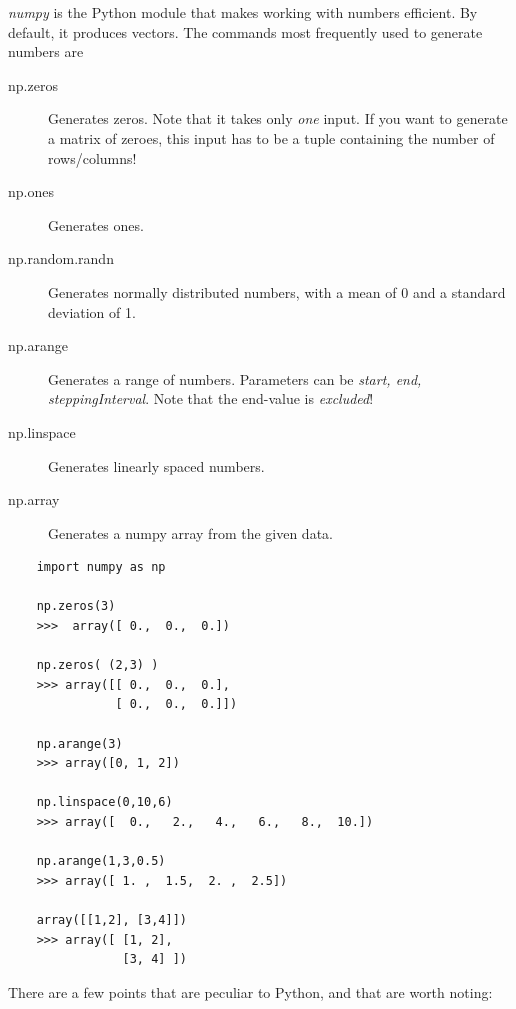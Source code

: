 \emph{numpy} is the Python module that makes working with numbers efficient. By default, it produces vectors. The commands most frequently used to generate numbers are

\begin{description}
  \item[np.zeros] Generates zeros. Note that it takes only \emph{one} input. If you want to generate a matrix of zeroes, this input has to be a tuple containing the number of rows/columns!
  \item[np.ones] Generates ones.
  \item[np.random.randn] Generates normally distributed numbers, with a mean of 0 and a standard deviation of 1.
  \item[np.arange] Generates a range of numbers. Parameters can be \emph{start, end, steppingInterval}. Note that the end-value is \emph{excluded}!
  \item[np.linspace] Generates linearly spaced numbers.
  \item[np.array] Generates a numpy array from the given data.
\end{description}

\begin{lstlisting}
    import numpy as np

    np.zeros(3)
    >>>  array([ 0.,  0.,  0.])

    np.zeros( (2,3) )
    >>> array([[ 0.,  0.,  0.],
               [ 0.,  0.,  0.]])

    np.arange(3)
    >>> array([0, 1, 2])

    np.linspace(0,10,6)
    >>> array([  0.,   2.,   4.,   6.,   8.,  10.])

    np.arange(1,3,0.5)
    >>> array([ 1. ,  1.5,  2. ,  2.5])

    array([[1,2], [3,4]])
    >>> array([ [1, 2],
                [3, 4] ])
\end{lstlisting}

There are a few points that are peculiar to Python, and that are worth noting:

